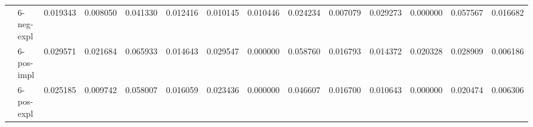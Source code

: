 \begin{tabular}{ll|llll|llll|llll}
 & 6-neg-expl & 0.019343 & 0.008050 & 0.041330 & 0.012416 & 0.010145 & 0.010446 & 0.024234 & 0.007079 & 0.029273 & 0.000000 & 0.057567 & 0.016682 \\
 & 6-pos-impl & 0.029571 & 0.021684 & 0.065933 & 0.014643 & 0.029547 & 0.000000 & 0.058760 & 0.016793 & 0.014372 & 0.020328 & 0.028909 & 0.006186 \\
 & 6-pos-expl & 0.025185 & 0.009742 & 0.058007 & 0.016059 & 0.023436 & 0.000000 & 0.046607 & 0.016700 & 0.010643 & 0.000000 & 0.020474 & 0.006306 \\
\end{tabular}


